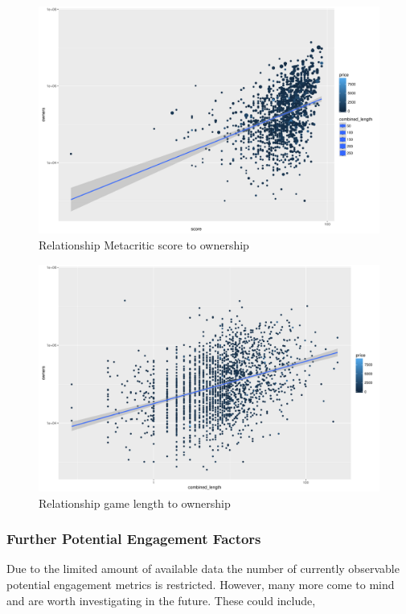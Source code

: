 \begin{figure}[!t]
	\centering
	\includegraphics[width=1.0\columnwidth]{images/rel-score-owners.pdf}
	\caption{Relationship Metacritic score to ownership}
\label{fig:rel-score-owners}
\end{figure}

\begin{figure}[!t]
	\centering
	\includegraphics[width=1.0\columnwidth]{images/rel-combinedlength-owners.pdf}
	\caption{Relationship game length to ownership}
\label{fig:rel-combinedlength-owners}
\end{figure}


\subsubsection{Further Potential Engagement Factors}

Due to the limited amount of available data the number of currently observable potential engagement metrics is restricted. However, many more come to mind and are worth investigating in the future. These could include,

